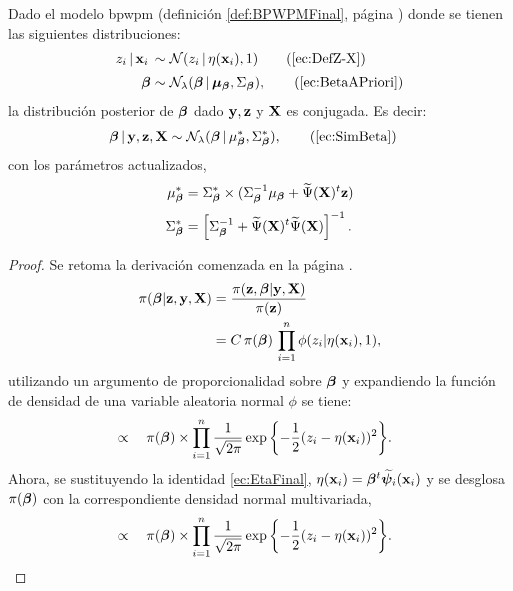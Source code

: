 \documentclass[../../Main/Main.tex]{subfiles}
\begin{document}


\begin{theorem}
Dado el modelo bpwpm (definición \ref{def:BPWPMFinal}, página \pageref{def:BPWPMFinal}) donde se tienen las siguientes distribuciones:
\begin{align}
z_i \,|\, \xni\, &\sim \mathcal{N}(z_i\,|\,\eta(\xni),1) 
	\tag{\ref{ec:DefZ-X}} \\[2pt]
\betabf &\sim \mathcal{N}_{\lambda}(\betabf\,|\,\bm{\mu}_{\betabf}, \Sigma_{\betabf}), \tag{\ref{ec:BetaAPriori}} 
\end{align}
la distribución posterior de $\bm{\beta}$ dado	$\mathbf{y},\mathbf{z}$ y $\mathbf{X}$ es conjugada. Es decir:
\begin{align}
	\betabf\,|\,\ysn,\zsn,\xmat &\sim \mathcal{N}_{\lambda}(\betabf\,|\,\mu_{\betabf}^*, \Sigma_{\betabf}^*), \tag{\ref{ec:SimBeta}}
\end{align}
con los parámetros actualizados,
\begin{align*}
	\mu_{\bm{\beta}}^* &= \Sigma_{\bm{\beta}}^* \times (\Sigma_{\bm{\beta}}^{-1}\mu_{\bm{\beta}} + \widetilde{\Psi}(\mathbf{X})^t\mathbf{z} ) \\[2pt]
	 \Sigma_{\bm{\beta}}^* &= \left[\Sigma_{\bm{\beta}}^{-1} + \widetilde{\Psi}(\mathbf{X})^t\widetilde{\Psi}(\mathbf{X})\right]^{-1}.
\end{align*}
\end{theorem}

\begin{proof}
Se retoma la derivación comenzada en la página \pageref{ec:DefProbaCond}.
\begin{align*}
	\pi(\bm{\beta}|\mathbf{z},\mathbf{y},\mathbf{X})
	& = \dfrac{\pi(\mathbf{z}, \bm{\beta}| \mathbf{y}, \mathbf{X})}{\pi(\mathbf{z})} \\
	& = C \,\pi(\bm{\beta}) \, \prod_{i = 1}^n\phi(z_i|\eta(\mathbf{x}_i),1),
\end{align*}
utilizando un argumento de proporcionalidad sobre $\bm{\beta}$ y expandiendo la función de densidad de una variable aleatoria normal $\phi$ se tiene:
\begin{align*}
	& \propto \quad \pi(\bm{\beta})\times \prod_{i = 1}^n \dfrac{1}{\sqrt{2\pi}}\exp{\left\{ -\dfrac{1}{2}(z_i - \eta(\mathbf{x}_i))^2 \right\}}.
\end{align*}
Ahora, se sustituyendo la identidad \eqref{ec:EtaFinal}, $\eta(\mathbf{x}_i) = \bm{\beta}^t\widetilde{\bm{\psi}}_i(\mathbf{x}_i)$ y se desglosa $\pi(\bm{\beta})$ con la correspondiente densidad normal multivariada,
\begin{align*}
	& \propto \quad \pi(\bm{\beta})\times \prod_{i = 1}^n \dfrac{1}{\sqrt{2\pi}}\exp{\left\{ -\dfrac{1}{2}(z_i - \eta(\mathbf{x}_i))^2 \right\}}.
\end{align*}

\end{proof}



\end{document}
